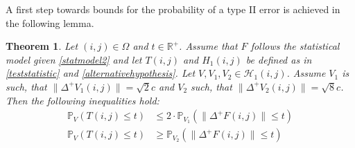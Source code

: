 \documentclass[a4paper,12pt]{article}
\newcommand{\norm}[1]{\lVert#1\rVert}
\theoremstyle{plain}
\newtheorem{theorem}{Theorem}[section]
\theoremstyle{definition}
\begin{document}
A first step towards bounds for the probability of a type II error is achieved in the following lemma.

\begin{theorem}\label{thm: typeIIboundssimulation}
	Let $(i, j) \in \Omega$ and $t \in \mathbb{R}^+$. Assume that $F$ follows the statistical model given \eqref{statmodel2} and let $T(i, j)$ and $H_1(i, j)$ be defined as in \eqref{teststatistic} and \eqref{alternativehypothesis}. Let $V, V_1, V_2 \in \mathcal{H}_1(i, j)$. Assume $V_1$ is such, that $\norm{\Delta^+ V_1(i, j)} = \sqrt{2} c$ and $V_2$ such, that $\norm{\Delta^+ V_2(i, j)} = \sqrt{8} c$. Then the following inequalities hold:
	\begin{align}
		\mathbb{P}_V\left( T(i, j) \leq t \right) &\leq 2 \cdot \mathbb{P}_{V_1}\left( \norm{\Delta^+ F(i, j)} \leq t \right) \label{eq: typeIIupperboundsimulation} \\
		\mathbb{P}_V\left( T(i, j) \leq t \right) &\geq \mathbb{P}_{V_2}\left( \norm{\Delta^+ F(i, j)} \leq t \right) \label{eq: typeIIlowerboundsimulation}
	\end{align}
\end{theorem}
\end{document}

